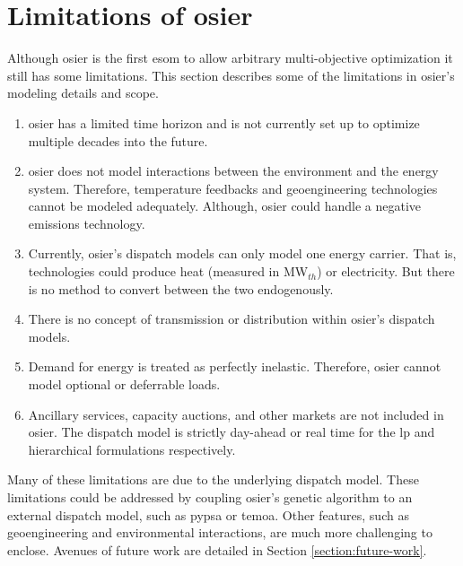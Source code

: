 \section{Limitations of \ac{osier}}

Although \ac{osier} is the first \ac{esom} to allow arbitrary multi-objective
optimization it still has some limitations. This section describes some of the limitations in \ac{osier}'s modeling details
and scope.

\begin{enumerate}
    \item \ac{osier} has a limited time horizon and is not currently set up to
    optimize multiple decades into the future.
    \item \ac{osier} does not model interactions between the environment and the
    energy system. Therefore, temperature feedbacks and geoengineering
    technologies cannot be modeled adequately. Although, \ac{osier} could handle
    a negative emissions technology.
    \item Currently, \ac{osier}'s dispatch models can only model one energy carrier. That is, technologies
    could produce heat (measured in MW$_{th}$) or electricity. But there is no method
    to convert between the two endogenously.
    \item There is no concept of transmission or distribution within \ac{osier}'s dispatch
    models. 
    \item Demand for energy is treated as perfectly inelastic. Therefore, \ac{osier} cannot model 
    optional or deferrable loads.
    \item Ancillary services, capacity auctions, and other markets are not included in \ac{osier}. The dispatch
    model is strictly day-ahead or real time for the \ac{lp} and hierarchical formulations respectively.
\end{enumerate}

Many of these limitations are due to the underlying dispatch model. These limitations could be addressed 
by coupling \ac{osier}'s genetic algorithm to an external dispatch model, such as \ac{pypsa} or \ac{temoa}.
Other features, such as geoengineering and environmental interactions, are much more challenging to enclose.
Avenues of future work are detailed in Section \ref{section:future-work}.

